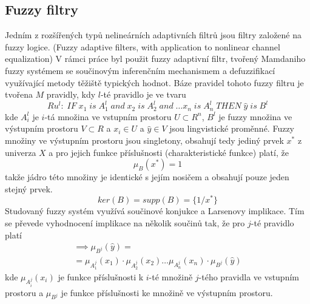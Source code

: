 \subsection{Fuzzy filtry}\label{chap:fuzzyf}
Jedním z rozšířených typů nelineárních adaptivních filtrů jsou filtry založené na fuzzy logice. (Fuzzy adaptive filters, with application to nonlinear channel equalization) V rámci práce byl použit fuzzy adaptivní filtr, tvořený Mamdaniho fuzzy systémem se součinovým inferenčním mechanismem a defuzzifikací využívající metody těžiště typických hodnot. Báze pravidel tohoto fuzzy filtru je tvořena $M$ pravidly, kdy $l$-té pravidlo je ve tvaru
\begin{equation}
    Ru^l: \; IF\; x_1\; is\;A_1^l \;and \;x_2 \;is\; A_2^l\; and\; \dots x_n \; is \;A_n^l \; THEN \; \hat{y} \; is \; B^l  
\end{equation}
kde $A_i^l$ je $i$-tá množina ve vstupním prostoru $U \subset R^n$, $B^l$ je fuzzy množina ve výstupním prostoru $V \subset R$ a $x_i \in U$ a $\hat{y} \in V$ jsou lingvistické proměnné. Fuzzy množiny ve výstupním prostoru jsou singletony, obsahují tedy jediný prvek $x^*$ z univerza $X$ a pro jejich funkce příslušnosti (charakteristické funkce) platí, že
\begin{equation}
    \mu_{B}(x^*) = 1
\end{equation}
takže jádro této množiny je identické s jejím nosičem a obsahují pouze jeden stejný prvek.
\begin{equation}
    ker(B)=supp(B)=\{1/x^*\}
\end{equation}
Studovaný fuzzy systém využívá součinové konjukce a Larsenovy implikace. Tím se převede vyhodnocení implikace na několik součinů tak, že pro $j$-té pravidlo platí
\begin{multline}
    [\mu_{A_1^j}(x_1) \; AND \; \mu_{A_2^j}(x_2) \; AND \dots AND \; \mu_{A_n^j}(x_n)] \implies \mu_{B^j}(\hat{y}) =  \\ = \mu_{A_1^j}(x_1) \cdot \mu_{A_2^j}(x_2) \dots \mu_{A_n^j}(x_n) \cdot \mu_{B^j}(\hat{y})
\end{multline}
kde $\mu_{A_i^j}(x_i)$ je funkce příslušnosti k $i$-té množině $j$-tého pravidla ve vstupním prostoru a $\mu_{B^j}$ je funkce příslušnosti ke množině ve výstupním prostoru. 

